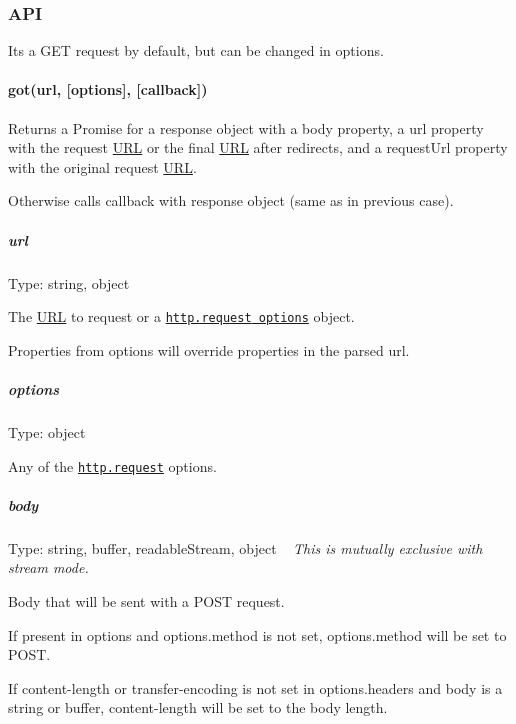 \subsubsection*{A\+PI}

It\textquotesingle{}s a {\ttfamily G\+ET} request by default, but can be changed in {\ttfamily options}.

\paragraph*{got(url, \mbox{[}options\mbox{]}, \mbox{[}callback\mbox{]})}

Returns a Promise for a {\ttfamily response} object with a {\ttfamily body} property, a {\ttfamily url} property with the request \mbox{\hyperlink{namespace_u_r_l}{U\+RL}} or the final \mbox{\hyperlink{namespace_u_r_l}{U\+RL}} after redirects, and a {\ttfamily request\+Url} property with the original request \mbox{\hyperlink{namespace_u_r_l}{U\+RL}}.

Otherwise calls callback with {\ttfamily response} object (same as in previous case).

\subparagraph*{url}

Type\+: {\ttfamily string}, {\ttfamily object}

The \mbox{\hyperlink{namespace_u_r_l}{U\+RL}} to request or a \href{https://nodejs.org/api/http.html#http_http_request_options_callback}{\tt {\ttfamily http.\+request} options} object.

Properties from {\ttfamily options} will override properties in the parsed {\ttfamily url}.

\subparagraph*{options}

Type\+: {\ttfamily object}

Any of the \href{http://nodejs.org/api/http.html#http_http_request_options_callback}{\tt {\ttfamily http.\+request}} options.

\subparagraph*{body}

Type\+: {\ttfamily string}, {\ttfamily buffer}, {\ttfamily readable\+Stream}, {\ttfamily object} ~\newline
 {\itshape This is mutually exclusive with stream mode.}

Body that will be sent with a {\ttfamily P\+O\+ST} request.

If present in {\ttfamily options} and {\ttfamily options.\+method} is not set, {\ttfamily options.\+method} will be set to {\ttfamily P\+O\+ST}.

If {\ttfamily content-\/length} or {\ttfamily transfer-\/encoding} is not set in {\ttfamily options.\+headers} and {\ttfamily body} is a string or buffer, {\ttfamily content-\/length} will be set to the body length.

